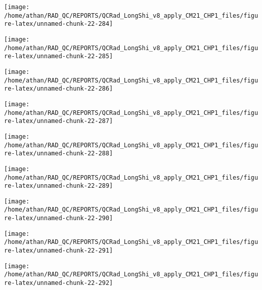 \documentclass[
  10pt,
  a4paper,oneside]{article}
\begin{document}
\begin{center}\texttt{[image: /home/athan/RAD\_QC/REPORTS/QCRad\_LongShi\_v8\_apply\_CM21\_CHP1\_files/figure-latex/unnamed-chunk-22-284]} \end{center}

\begin{center}\texttt{[image: /home/athan/RAD\_QC/REPORTS/QCRad\_LongShi\_v8\_apply\_CM21\_CHP1\_files/figure-latex/unnamed-chunk-22-285]} \end{center}

\begin{center}\texttt{[image: /home/athan/RAD\_QC/REPORTS/QCRad\_LongShi\_v8\_apply\_CM21\_CHP1\_files/figure-latex/unnamed-chunk-22-286]} \end{center}

\begin{center}\texttt{[image: /home/athan/RAD\_QC/REPORTS/QCRad\_LongShi\_v8\_apply\_CM21\_CHP1\_files/figure-latex/unnamed-chunk-22-287]} \end{center}

\begin{center}\texttt{[image: /home/athan/RAD\_QC/REPORTS/QCRad\_LongShi\_v8\_apply\_CM21\_CHP1\_files/figure-latex/unnamed-chunk-22-288]} \end{center}

\begin{center}\texttt{[image: /home/athan/RAD\_QC/REPORTS/QCRad\_LongShi\_v8\_apply\_CM21\_CHP1\_files/figure-latex/unnamed-chunk-22-289]} \end{center}

\begin{center}\texttt{[image: /home/athan/RAD\_QC/REPORTS/QCRad\_LongShi\_v8\_apply\_CM21\_CHP1\_files/figure-latex/unnamed-chunk-22-290]} \end{center}

\begin{center}\texttt{[image: /home/athan/RAD\_QC/REPORTS/QCRad\_LongShi\_v8\_apply\_CM21\_CHP1\_files/figure-latex/unnamed-chunk-22-291]} \end{center}

\begin{center}\texttt{[image: /home/athan/RAD\_QC/REPORTS/QCRad\_LongShi\_v8\_apply\_CM21\_CHP1\_files/figure-latex/unnamed-chunk-22-292]} \end{center}
\end{document}
